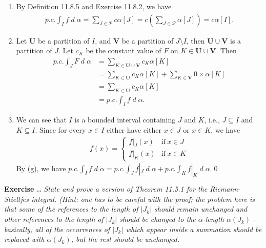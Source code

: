 \documentclass{book}
\DeclareMathOperator{\dd}{\mathit{d}}
\newcounter{Exercise}[section]
\renewcommand{\theExercise}{\thesection.\arabic{Exercise}.}
\newcommand{\new}{\vspace{1.5em}\noindent\textbf{{Exercise \stepcounter{Exercise}\textbf{\theExercise}}} }
\begin{document}
\begin{enumerate}
        \item By Definition 11.8.5 and Exercise 11.8.2, we have
            \begin{align*}
                p.c.\int_{I} f \dd\alpha
                =\sum_{J \in \mathcal{P}} c\alpha[J]
                = c \left(\sum_{J \in \mathcal{P}} \alpha[J]\right)
                = c\alpha[I].
            \end{align*}
        \item Let $\mathbf{U}$ be a partition of $I$, and $\mathbf{V}$ be a partition of $J \setminus I$, then $\mathbf{U} \cup \mathbf{V}$ is a partition of $J$. Let $c_K$ be the constant value of $F$ on $K \in \mathbf{U} \cup \mathbf{V}$. Then
            \begin{align*}
                p.c.\int_{J}F \dd\alpha
                &= \sum_{K \in \mathbf{U} \cup \mathbf{V}} c_K\alpha[K]\\
                &= \sum_{K \in \mathbf{U}} c_K\alpha[K] + \sum_{K \in \mathbf{V}} 0 \times \alpha[K]\\
                &= \sum_{K \in \mathbf{U}} c_K\alpha[K]\\
                &= p.c.\int_{I} f \dd\alpha.
            \end{align*}
        \item We can see that $I$ is a bounded interval containing $J$ and $K$, i.e., $J \subseteq I$ and $K \subseteq I$. Since for every $x \in I$ either have either $x \in J$ or $x\in K$, we have
            \begin{align*}
                f(x)=\left\{\begin{array}{cc}
                    f|_J(x)&\text{if}\ x\in J\\
                    f|_K(x)&\text{if}\ x\in K
                \end{array}\right.
            \end{align*}
        By (g), we have $p.c.\int_{I} f \dd\alpha =p.c.\int_{J} f|_J \dd\alpha + p.c.\int_{K} f|_K \dd\alpha$.\qed
    \end{enumerate}

\new\emph{State and prove a version of Theorem 11.5.1 for the Riemann-Stieltjes integral. (Hint: one has to be careful with the proof; the problem here is that some of the references to the length of $|J_k|$ should remain unchanged and other references to the length of $|J_k|$ should be changed to the $\alpha$-length $\alpha(J_k)$ - basically, all of the occurrences of $|J_k|$ which appear inside a summation should be replaced with $\alpha(J_k)$, but the rest should be unchanged.}
\end{document}
